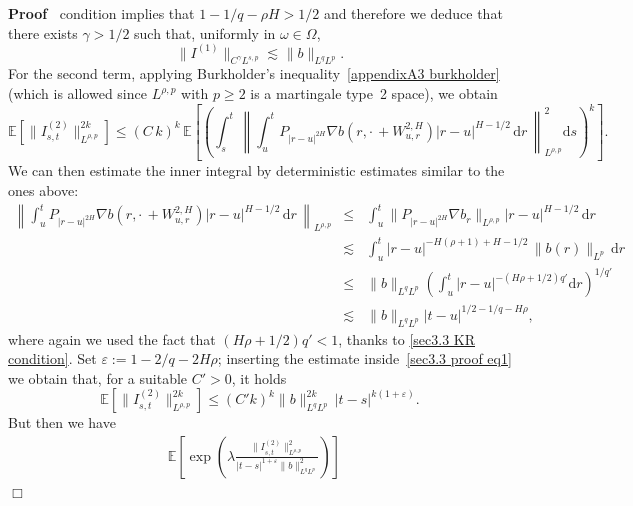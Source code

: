 \documentclass[10pt]{article}
\newcommand{\assign}{:=}
\newcommand{\mathd}{\mathrm{d}}
\newenvironment{proof}{\noindent\textbf{Proof\ }}{\hspace*{\fill}$\Box$\medskip}
\begin{document}
\begin{proof}
{{  condition}} implies that $1 - 1 / q - \rho H > 1 / 2$ and therefore we
  deduce that there exists $\gamma > 1 / 2$ such that, uniformly in $\omega
  \in \Omega$,
  \begin{equation}
    \| I^{(1)} \|_{C^{\gamma} L^{s, p}} \lesssim_{} \| b \|_{L^q L^p}
    \label{sec3.3 proof eq0} .
  \end{equation}
  For the second term, applying Burkholder's inequality~{\eqref{appendixA3
  burkholder}} (which is allowed since $L^{\rho, p}$ with $p \geqslant 2$ is a
  martingale type~2 space), we obtain
  \begin{equation}
    \mathbb{E} [\| I^{(2)}_{s, t} \|_{L^{\rho, p}}^{2 k}] \leqslant \left( C
    \, k \right)^k \, \mathbb{E} \left[ \left( \int_s^t \, \left\| \int_u^t
    P_{| r - u |^{2 H}} \nabla b \left( r, \cdot \, + W^{2, H}_{u, r} \right)
    | r - u |^{H - 1 / 2} \, \mathd r \, \right\|^2_{L^{\rho, p}} \mathd s
    \right)^k \right] \label{sec3.3 proof eq1} .
  \end{equation}
  We can then estimate the inner integral by deterministic estimates similar
  to the ones above:
  \begin{eqnarray*}
    \left\| \int_u^t P_{| r - u |^{2 H}} \nabla b \left( r, \cdot \, + W^{2,
    H}_{u, r} \right) | r - u |^{H - 1 / 2} \, \mathd r \, \right\|_{L^{\rho,
    p}} & \leqslant & \int_u^t \| P_{| r - u |^{2 H}} \nabla b_r \|_{L^{\rho,
    p}} | r - u |^{H - 1 / 2} \, \mathd r\\
    & \lesssim_{} & \int_u^t | r - u |^{- H (\rho + 1) + H - 1 / 2} \, \| b
    (r) \|_{L^p} \, \mathd r\\
    & \leqslant & \| b \|_{L^q L^p}  \left( \int_u^t | r - u |^{- (H \rho + 1
    / 2) q'} \mathd r \right)^{1 / q'}\\
    & \lesssim & \| b \|_{L^q L^p}  | t - u |^{1 / 2 - 1 / q - H \rho},
  \end{eqnarray*}
  where again we used the fact that $(H \rho + 1 / 2) q' < 1$, thanks to
  {\eqref{sec3.3 KR condition}}. Set $\varepsilon \assign 1 - 2 / q - 2 H
  \rho$; inserting the estimate inside~{\eqref{sec3.3 proof eq1}} we obtain
  that, for a suitable $C' > 0$, it holds
  \[ \mathbb{E} [\| I^{(2)}_{s, t} \|_{L^{\rho, p}}^{2 k}] \leqslant (C' k)^k
     \| b \|^{2 k}_{L^q L^p} \, | t - s |^{k (1 + \varepsilon)} . \]
  But then we have
%  
  \begin{align*}
    \mathbb{E} \left[ \exp \left( \lambda \frac{\| I^{(2)}_{s, t} \|_{L^{\rho,
    p}}^2}{| t - s |^{1 + \varepsilon} \| b \|^2_{L^q L^p}} \right) \right] &

\end{align*}
\end{proof}
\end{document}
